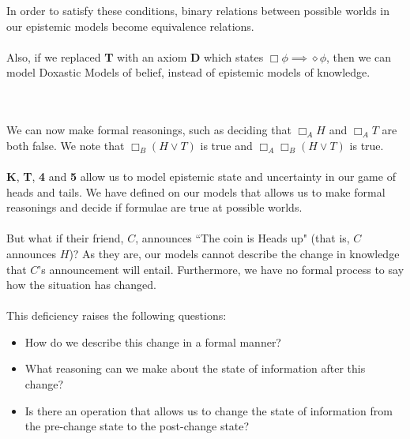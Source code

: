 \documentclass[12pt, a4paper, titlepage]{scrartcl}
\begin{document}
\begin{note}
In order to satisfy these conditions, binary relations between possible worlds
in our epistemic models become equivalence relations.\\
\\
Also, if we replaced {\bf T} with an axiom {\bf D} which states $\Box \phi
\implies \diamond \phi$, then we can model Doxastic Models of belief, instead of
epistemic models of knowledge.
\end{note}\\
\\
We can now make formal reasonings, such as deciding that $\Box_A H$ and $\Box_A
T$ are both false.
We note that $\Box_B (H \lor T)$ is true and $\Box_A \Box_B (H \lor T)$ is
true.\\
\\
{\bf K}, {\bf T}, {\bf 4} and {\bf 5} allow us to model epistemic state and
uncertainty in our game of heads and tails.
We have defined on our models that allows us to make formal reasonings and
decide if formulae are true at possible worlds.\\
\\
But what if their friend, $C$, announces ``The coin is Heads up" (that is,
$C$ announces $H$)?
As they are, our models cannot describe the change in knowledge that
$C$'s announcement will entail.
Furthermore, we have no formal process to say how the situation has changed.\\
\\
This deficiency raises the following questions:
\begin{itemize}
	\item How do we describe this change in a formal manner?
	\item What reasoning can we make about the state of information after this
	change?
	\item Is there an operation that allows us to change the state of information
	from the pre-change state to the post-change state?
\end{itemize}
\end{document}
